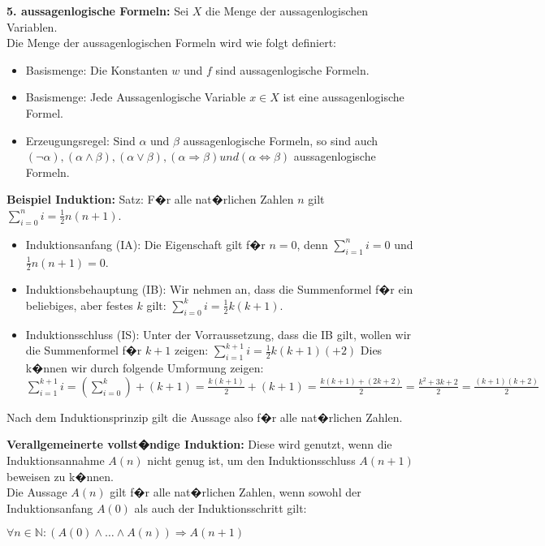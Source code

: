 \textbf{5. aussagenlogische Formeln:} Sei $X$ die Menge der aussagenlogischen Variablen.\\
Die Menge der aussagenlogischen Formeln wird wie folgt definiert:
\begin{itemize}
  \item Basismenge: Die Konstanten $w$ und $f$ sind aussagenlogische Formeln.
  \item Basismenge: Jede Aussagenlogische Variable $x \in X$ ist eine aussagenlogische Formel.
  \item Erzeugungsregel: Sind $\alpha$ und $\beta$ aussagenlogische Formeln, so sind auch $(\neg \alpha), (\alpha \wedge \beta), (\alpha \vee \beta), (\alpha \Rightarrow \beta) und (\alpha \Leftrightarrow \beta)$ aussagenlogische Formeln.
\end{itemize}

\textbf{Beispiel Induktion:}
Satz: F�r alle nat�rlichen Zahlen $n$ gilt $\sum_{i=0}^{n} i = \frac{1}{2}n(n + 1)$.
\begin{itemize}
  \item Induktionsanfang (IA): Die Eigenschaft gilt f�r $n = 0$, denn $\sum_{i=1}^{n} i = 0$ und $\frac{1}{2}n(n + 1) = 0$.
  \item Induktionsbehauptung (IB): Wir nehmen an, dass die Summenformel f�r ein beliebiges, aber festes $k$ gilt: $\sum_{i=0}^{k} i = \frac{1}{2}k(k + 1)$.
  \item Induktionsschluss (IS): Unter der Vorraussetzung, dass die IB gilt, wollen wir die Summenformel f�r $k + 1$ zeigen: $\sum_{i=1}^{k+1}i = \frac{1}{2}k(k + 1)(+2)$ Dies k�nnen wir durch folgende Umformung zeigen:\\
  $\sum_{i=1}^{k+1}i = (\sum_{i=0}^{k})+(k+1) = \frac{k(k+1)}{2}+(k+1) = \frac{k(k+1)+(2k+2)}{2} = \frac{k^2+3k+2}{2} = \frac{(k+1)(k+2)}{2}$
\end{itemize}
Nach dem Induktionsprinzip gilt die Aussage also f�r alle nat�rlichen Zahlen.

\textbf{Verallgemeinerte vollst�ndige Induktion:}
Diese wird genutzt, wenn die Induktionsannahme $A(n)$ nicht genug ist, um den Induktionsschluss $A(n+1)$ beweisen zu k�nnen.\\
Die Aussage $A(n)$ gilt f�r alle nat�rlichen Zahlen, wenn sowohl der Induktionsanfang $A(0)$ als auch der Induktionsschritt gilt:
\begin{center}
  $\forall n \in \mathbb{N} : (A(0) \wedge \dots \wedge A(n)) \Rightarrow A(n+1)$
\end{center}


